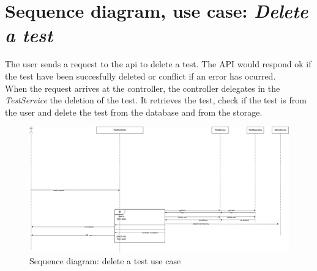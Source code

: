     \section{Sequence diagram, use case: \textit{Delete a test}}
    The user sends a request to the api to delete a test. The API would respond ok if the test have been succesfully deleted or conflict if an error has ocurred. \\
    When the request arrives at the controller, the controller delegates in the \textit{TestService} the deletion of the test. It retrieves the test, check if the test is from the user and delete the test from the database and from the storage. \\
        \begin{figure}[H]
            \centering
                \includegraphics[width=\textwidth]{assets/diagrams/deletetest.png}
            \caption{Sequence diagram: delete a test use case}
            \label{fig:implementation_deletetest}
        \end{figure}

